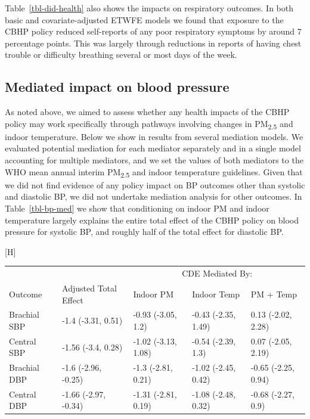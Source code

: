 \documentclass[
  letterpaper,
  DIV=11,
  numbers=noendperiod]{scrartcl}
\makeatletter
\renewenvironment{table}%
  {\renewcommand\familydefault\sfdefault
   \@float{table}}
  {\end@float}
\makeatother
\begin{document}
Table~\ref{tbl-did-health} also shows the impacts on respiratory
outcomes. In both basic and covariate-adjusted ETWFE models we found
that exposure to the CBHP policy reduced self-reports of any poor
respiratory symptoms by around 7 percentage points. This was largely
through reductions in reports of having chest trouble or difficulty
breathing several or most days of the week.

\hypertarget{mediated-impact-on-blood-pressure}{%
\subsection{Mediated impact on blood
pressure}\label{mediated-impact-on-blood-pressure}}

As noted above, we aimed to assess whether any health impacts of the
CBHP policy may work specifically through pathways involving changes in
PM\textsubscript{2.5} and indoor temperature. Below we show in results
from several mediation models. We evaluated potential mediation for each
mediator separately and in a single model accounting for multiple
mediators, and we set the values of both mediators to the WHO mean
annual interim PM\textsubscript{2.5} and indoor temperature guidelines.
Given that we did not find evidence of any policy impact on BP outcomes
other than systolic and diastolic BP, we did not undertake mediation
analysis for other outcomes. In Table~\ref{tbl-bp-med} we show that
conditioning on indoor PM and indoor temperature largely explains the
entire total effect of the CBHP policy on blood pressure for systolic
BP, and roughly half of the total effect for diastolic BP.

\hypertarget{tbl-bp-med}{}
\begin{table}[H]
\caption{\label{tbl-bp-med}Controlled direct effects for the CBHP policy }\tabularnewline

\centering
\begin{tabular}{lllll}
\toprule
\multicolumn{2}{c}{ } & \multicolumn{3}{c}{CDE Mediated By:} \\
\cmidrule(l{3pt}r{3pt}){3-5}
Outcome & Adjusted Total Effect & Indoor PM & Indoor Temp & PM + Temp\\
\midrule
Brachial SBP & -1.4 (-3.31, 0.51) & -0.93 (-3.05, 1.2) & -0.43 (-2.35, 1.49) & 0.13 (-2.02, 2.28)\\
Central SBP & -1.56 (-3.4, 0.28) & -1.02 (-3.13, 1.08) & -0.54 (-2.39, 1.3) & 0.07 (-2.05, 2.19)\\
Brachial DBP & -1.6 (-2.96, -0.25) & -1.3 (-2.81, 0.21) & -1.02 (-2.45, 0.42) & -0.65 (-2.25, 0.94)\\
Central DBP & -1.66 (-2.97, -0.34) & -1.31 (-2.81, 0.19) & -1.08 (-2.48, 0.32) & -0.68 (-2.27, 0.9)\\
\bottomrule
\end{tabular}
\end{table}
\end{document}
